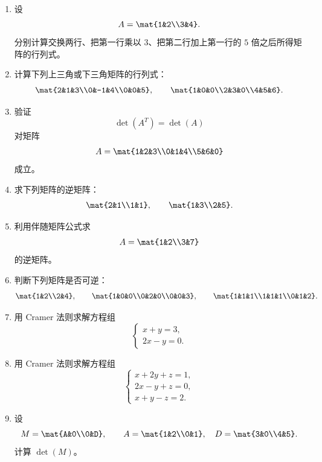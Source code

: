 \begin{enumerate}[label=\arabic*.]
  \item \basic 设
  \[
  A=\mat{1&2\\3&4}.
  \]
  分别计算交换两行、把第一行乘以 $3$、把第二行加上第一行的 $5$ 倍之后所得矩阵的行列式。

  \item \basic 计算下列上三角或下三角矩阵的行列式：
  \[
  \mat{2&1&3\\0&-1&4\\0&0&5},
  \qquad
  \mat{1&0&0\\2&3&0\\4&5&6}.
  \]

  \item \basic 验证
  \[
  \det(A^T)=\det(A)
  \]
  对矩阵
  \[
  A=\mat{1&2&3\\0&1&4\\5&6&0}
  \]
  成立。

  \item \basic 求下列矩阵的逆矩阵：
  \[
  \mat{2&1\\1&1},
  \qquad
  \mat{1&3\\2&5}.
  \]

  \item \basic 利用伴随矩阵公式求
  \[
  A=\mat{1&2\\3&7}
  \]
  的逆矩阵。

  \item \basic 判断下列矩阵是否可逆：
  \[
  \mat{1&2\\2&4},
  \qquad
  \mat{1&0&0\\0&2&0\\0&0&3},
  \qquad
  \mat{1&1&1\\1&1&1\\0&1&2}.
  \]

  \item \basic 用 Cramer 法则求解方程组
  \[
  \begin{cases}
  x+y=3,\\
  2x-y=0.
  \end{cases}
  \]

  \item \basic 用 Cramer 法则求解方程组
  \[
  \begin{cases}
  x+2y+z=1,\\
  2x-y+z=0,\\
  x+y-z=2.
  \end{cases}
  \]

  \item \basic 设
  \[
  M=\mat{A&0\\0&D},
  \qquad
  A=\mat{1&2\\0&1},\quad D=\mat{3&0\\4&5}.
  \]
  计算 $\det(M)$。


\end{enumerate}
